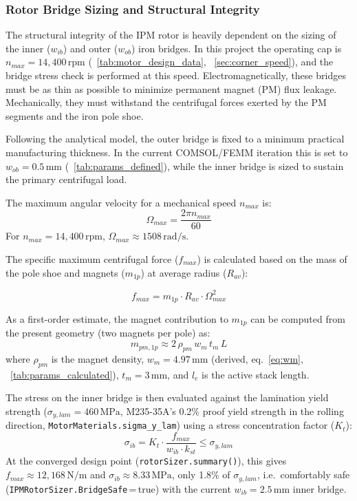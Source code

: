 \documentclass[10pt,final,journal,a4paper,oneside,twocolumn]{IEEEtran}
\begin{document}
\subsubsection{Rotor Bridge Sizing and Structural Integrity}
\label{sec:bridge_sizing}
The structural integrity of the IPM rotor is heavily dependent on the sizing of the inner ($w_{ib}$) and outer ($w_{ob}$) iron bridges. In this project the operating cap is $n_{max}=14{,}400\,\text{rpm}$ (\tablename~\ref{tab:motor_design_data}, \sectionname~\ref{sec:corner_speed}), and the bridge stress check is performed at this speed.
Electromagnetically, these bridges must be as thin as possible to minimize permanent magnet (PM) flux leakage. Mechanically, they must withstand the centrifugal forces exerted by the PM segments and the iron pole shoe.

Following the analytical model, the outer bridge is fixed to a minimum practical manufacturing thickness. In the current COMSOL/FEMM iteration this is set to $w_{ob}=0.5\,\text{mm}$ (\tablename~\ref{tab:params_defined}), while the inner bridge is sized to sustain the primary centrifugal load.

The maximum angular velocity for a mechanical speed $n_{max}$ is:
\begin{equation}
    \Omega_{max} = \frac{2\pi n_{max}}{60}
\end{equation}
For $n_{max}=14{,}400\,\text{rpm}$, $\Omega_{max}\approx 1508\,\text{rad/s}$.

The specific maximum centrifugal force ($f_{max}$) is calculated based on the mass of the pole shoe and magnets ($m_{1p}$) at average radius ($R_{av}$):

\begin{equation}
    f_{max} = m_{1p} \cdot R_{av} \cdot \Omega_{max}^2
\end{equation}

As a first-order estimate, the magnet contribution to $m_{1p}$ can be computed from the present geometry (two magnets per pole) as:
\begin{equation}
    m_{pm,1p} \approx 2\,\rho_{pm}\,w_m\,t_m\,L
\end{equation}
where $\rho_{pm}$ is the magnet density, $w_m=4.97\,\text{mm}$ (derived, eq.~\ref{eq:wm}, \tablename~\ref{tab:params_calculated}), $t_m=3\,\text{mm}$, and $l_e$ is the active stack length.

The stress on the inner bridge is then evaluated against the lamination yield strength ($\sigma_{y,lam}=460\,\text{MPa}$, M235-35A's 0.2\% proof yield strength in the rolling direction, \texttt{MotorMaterials.sigma\_y\_lam}) using a stress concentration factor ($K_t$):
\begin{equation}
    \sigma_{ib} = K_t \cdot \frac{f_{max}}{w_{ib} \cdot k_{st}} \leq \sigma_{y,lam}
\end{equation}
At the converged design point (\texttt{rotorSizer.summary()}), this gives $f_{max}\approx12{,}168\,\text{N/m}$ and $\sigma_{ib}\approx8.33\,\text{MPa}$, only 1.8\% of $\sigma_{y,lam}$, i.e.\ comfortably safe (\texttt{IPMRotorSizer.BridgeSafe}\,=\,true) with the current $w_{ib}=2.5\,\text{mm}$ inner bridge.
\end{document}
